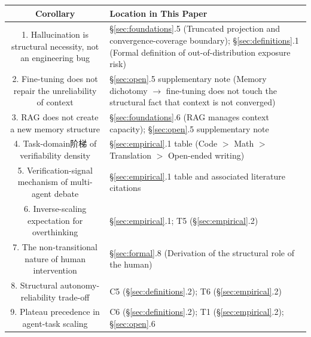 \documentclass[11pt,a4paper]{article}
\theoremstyle{definition}
\begin{document}
\begin{table}[H]
\centering
\begin{tabular}{@{}c@{}p{8.5cm}@{}}
\toprule
\textbf{Corollary} & \textbf{Location in This Paper} \\
\midrule
1. Hallucination is structural necessity, not an engineering bug & \S\ref{sec:foundations}.5 (Truncated projection and convergence-coverage boundary); \S\ref{sec:definitions}.1 (Formal definition of out-of-distribution exposure risk) \\
2. Fine-tuning does not repair the unreliability of context & \S\ref{sec:open}.5 supplementary note (Memory dichotomy $\to$ fine-tuning does not touch the structural fact that context is not converged) \\
3. RAG does not create a new memory structure & \S\ref{sec:foundations}.6 (RAG manages context capacity); \S\ref{sec:open}.5 supplementary note \\
4. Task-domain阶梯 of verifiability density & \S\ref{sec:empirical}.1 table (Code $>$ Math $>$ Translation $>$ Open-ended writing) \\
5. Verification-signal mechanism of multi-agent debate & \S\ref{sec:empirical}.1 table and associated literature citations \\
6. Inverse-scaling expectation for overthinking & \S\ref{sec:empirical}.1; T5 (\S\ref{sec:empirical}.2) \\
7. The non-transitional nature of human intervention & \S\ref{sec:formal}.8 (Derivation of the structural role of the human) \\
8. Structural autonomy-reliability trade-off & C5 (\S\ref{sec:definitions}.2); T6 (\S\ref{sec:empirical}.2) \\
9. Plateau precedence in agent-task scaling & C6 (\S\ref{sec:definitions}.2); T1 (\S\ref{sec:empirical}.2); \S\ref{sec:open}.6 \\
\bottomrule
\end{tabular}
\end{table}

\newpage
\printbibliography
\end{document}
